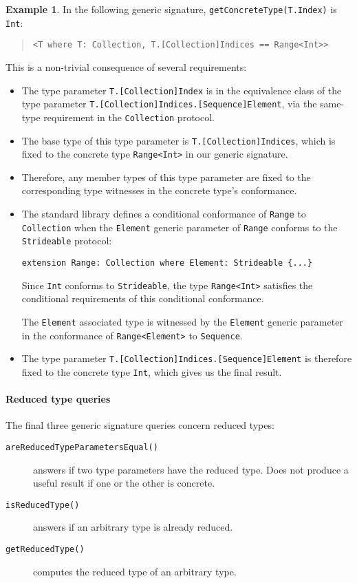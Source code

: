 \documentclass[a4paper,headsepline,bibliography=totoc,toc=flat,fleqn,twoside=semi]{scrbook}
\theoremstyle{definition}
\theoremstyle{definition}
\newtheorem{example}{Example}[chapter]
\theoremstyle{definition}
\begin{document}
\begin{example}
In the following generic signature, \texttt{getConcreteType(T.Index)} is \texttt{Int}:
\begin{quote}
\begin{verbatim}
<T where T: Collection, T.[Collection]Indices == Range<Int>>
\end{verbatim}
\end{quote}
This is a non-trivial consequence of several requirements:
\begin{itemize}
\item The type parameter \texttt{T.[Collection]Index} is in the equivalence class of the type parameter \texttt{T.[Collection]Indices.[Sequence]Element}, via the same-type requirement in the \texttt{Collection} protocol.
\item The base type of this type parameter is \texttt{T.[Collection]Indices}, which is fixed to the concrete type \texttt{Range<Int>} in our generic signature.
\item Therefore, any member types of this type parameter are fixed to the corresponding type witnesses in the concrete type's conformance.
\item The standard library defines a conditional conformance of \texttt{Range} to \texttt{Collection} when the \texttt{Element} generic parameter of \texttt{Range} conforms to the \texttt{Strideable} protocol:
\begin{Verbatim}
extension Range: Collection where Element: Strideable {...}
\end{Verbatim}
Since \texttt{Int} conforms to \texttt{Strideable}, the type \texttt{Range<Int>} satisfies the conditional requirements of this conditional conformance.

The \texttt{Element} associated type is witnessed by the \texttt{Element} generic parameter in the conformance of \texttt{Range<Element>} to \texttt{Sequence}.
\item The type parameter \texttt{T.[Collection]Indices.[Sequence]Element} is therefore fixed to the concrete type \texttt{Int}, which gives us the final result.
\end{itemize}
\end{example}

\paragraph{Reduced type queries}
The final three generic signature queries concern reduced types:
\begin{description}
\item [\texttt{areReducedTypeParametersEqual()}] answers if two type parameters have the reduced type. Does not produce a useful result if one or the other is concrete.
\item [\texttt{isReducedType()}] answers if an arbitrary type is already reduced.
\item [\texttt{getReducedType()}] computes the reduced type of an arbitrary type.
\end{description}
\end{document}

